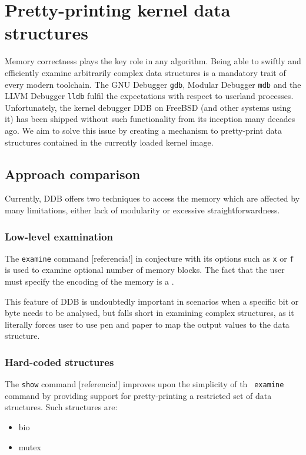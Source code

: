\chapter{Pretty-printing kernel data structures}
Memory correctness plays the key role in any algorithm. Being able to swiftly
and efficiently examine arbitrarily complex data structures is a mandatory
trait of every modern toolchain. The GNU Debugger {\tt gdb}, Modular Debugger
{\tt mdb} and the LLVM Debugger {\tt lldb} fulfil the expectations with respect
to userland processes. Unfortunately, the kernel debugger DDB on FreeBSD (and
other systems using it) has been shipped without such functionality from
its inception many decades ago. We aim to solve this issue by creating a
mechanism to pretty-print data structures contained in the currently loaded
kernel image.

\section{Approach comparison}
Currently, DDB offers two techniques to access the memory which are affected by
many limitations, either lack of modularity or excessive straightforwardness.

\subsection{Low-level examination}
The {\tt examine} command [referencia!] in conjecture with its options such as
{\tt x} or {\tt f} is used to examine optional number of memory blocks. The
fact that the user must specify the encoding of the memory is a .

This feature of DDB is undoubtedly important in scenarios when a specific
bit or byte needs to be analysed, but falls short in examining complex
structures, as it literally forces user to use pen and paper to map the output
values to the data structure.

\subsection{Hard-coded structures}
The {\tt show} command [referencia!] improves upon the simplicity of th {\tt
examine} command by providing support for pretty-printing a restricted set of
data structures. Such structures are:
\begin{itemize}
	\item bio
	\item mutex
\end{itemize}

